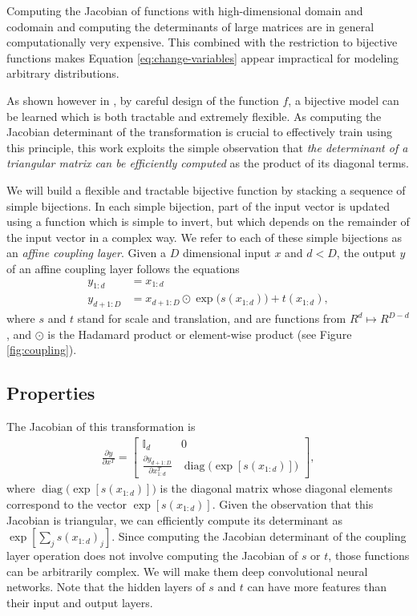\documentclass{article}
\DeclareMathOperator{\diag} {diag}
\def\Id{{\mathbb{I}}}
\begin{document}
Computing the Jacobian of functions with high-dimensional domain and codomain and computing the determinants of large matrices are in general computationally very expensive. This combined with the restriction to bijective functions makes Equation \ref{eq:change-variables} appear impractical for modeling arbitrary distributions.

As shown however in \citep{dinh2014nice}, by careful design of the function $f$, a bijective model can be learned which is both tractable and extremely flexible.
As computing the Jacobian determinant of the transformation is crucial to effectively train using this principle, this work exploits the simple observation that \emph{the determinant of a triangular matrix can be efficiently computed} as the product of its diagonal terms.


We will build a flexible and tractable bijective function by stacking a sequence of simple bijections.
In each simple bijection,
part of the input vector is updated using a function which is simple to invert,
but which depends on the remainder of the input vector in a complex way.
We refer to each of these simple bijections as an \emph{affine coupling layer}.
Given a $D$ dimensional input $x$ and $d < D$, the output $y$ of an affine coupling layer follows the equations
\begin{align}
y_{1:d} &= x_{1:d}\\
y_{d+1:D} &= x_{d+1:D} \odot \exp\big(s(x_{1:d})\big) + t(x_{1:d})
,
\end{align}
where $s$ and $t$ stand for scale and translation, and are functions from $R^{d} \mapsto R^{D - d}$, and $\odot$ is the Hadamard product or element-wise product (see Figure \ref{fig:coupling}).


\subsection{Properties}
The Jacobian of this transformation is
\begin{align}
\frac{\partial y}{\partial x^T} = \left[\begin{array}{cc}
\Id_{d} & 0 \\
\frac{\partial y_{d+1:D}}{\partial x_{1:d}^T} & \diag\big(\exp\left[s\left(x_{1:d}\right)\right]\big)
\end{array} \right]
,
\end{align}
where $\diag\big(\exp\left[s\left(x_{1:d}\right)\right]\big)$ is the diagonal matrix whose diagonal elements correspond to the vector $\exp\left[s\left(x_{1:d}\right)\right]$. Given the observation that this Jacobian is triangular, we can efficiently compute its determinant as $\exp\left[\sum_{j}{s\left(x_{1:d}\right)_j}\right]$. Since computing the Jacobian determinant of the coupling layer operation does not involve computing the Jacobian of $s$ or $t$, those functions can be arbitrarily complex. We will make them deep convolutional neural networks. Note that the hidden layers of $s$ and $t$ can have more features than their input and output layers.
\end{document}
